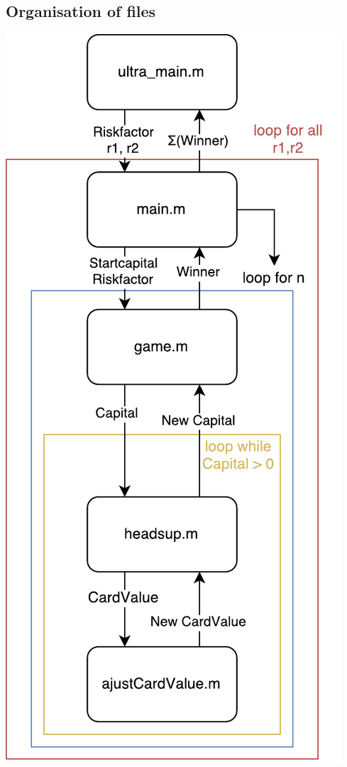 \documentclass[11pt]{article}
\begin{document}
\subsection{Organisation of files}
\begin{minipage}{0.48\textwidth}
\includegraphics[width=\textwidth]{Graphics/diagram_senkrecht.pdf}
\end{minipage}
\end{document}
